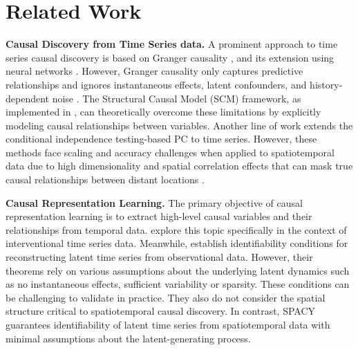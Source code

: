\section{Related Work}
\textbf{Causal Discovery from Time Series data.} A prominent approach to time series causal discovery is based on Granger causality \citep{granger1969investigating}, and its extension using neural networks \citep{khanna2019economy, tank2021neural, lowe2022amortized, cheng2023cutsneuralcausaldiscovery, cheng2024cuts+}.  However, Granger causality only captures predictive relationships and ignores instantaneous effects, latent confounders, and history-dependent noise \citep{peters2017elements}. The Structural Causal Model (SCM) framework, as implemented in  \citet{hyvarinen2010estimation, pamfil2020dynotears, gong2022rhino, wang2024neuralstructurelearningstochastic}, can theoretically overcome these limitations by explicitly modeling causal relationships between variables. Another line of work \citep{runge2019detecting, runge2020discovering}  extends the conditional independence testing-based PC \citep{spirtes2000causation} to time series. However, these methods face scaling and accuracy challenges when applied to spatiotemporal data due to high dimensionality and spatial correlation effects that can mask true causal relationships between distant locations  \citep{xavi2022teleconnection}. 


\textbf{Causal Representation Learning.} The primary objective of causal representation learning is to extract high-level causal variables and their relationships from temporal data. \citet{lippe2022citris, lippecausal} explore this topic specifically in the context of interventional time series data. Meanwhile, \citet{yao2021learning, yao2022temporally, chencaring, moriokacausal, li2024identification, lachapelle2024nonparametric} establish identifiability conditions for reconstructing latent time series from observational data. However, their theorems  rely on various assumptions about the underlying latent dynamics such as no instantaneous effects, sufficient variability or sparsity. These conditions can be challenging to validate in practice. They also do not consider the spatial structure critical to spatiotemporal causal discovery.  In contrast, SPACY guarantees identifiability of latent time series from spatiotemporal data with minimal assumptions about the latent-generating process. 

